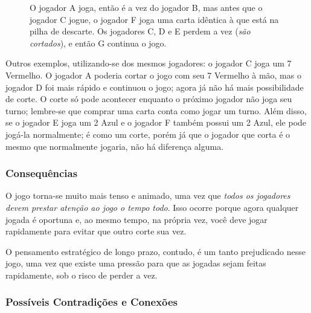 \begin{figure}[!h]
\centering
{}
\caption{O jogador A joga, então é a vez do jogador B, mas antes que o jogador C jogue, o jogador F joga uma carta idêntica à que está na pilha de descarte. Os jogadores C, D e E perdem a vez (\emph{são cortados}), e então G continua o jogo.}
\end{figure}

Outros exemplos, utilizando-se dos mesmos jogadores: o jogador C joga um 7 Vermelho. O jogador A poderia cortar o jogo com seu 7 Vermelho à mão, mas o jogador D foi mais rápido e continuou o jogo; agora já não há mais possibilidade de corte. O corte só pode acontecer enquanto o próximo jogador não joga seu turno; lembre-se que comprar uma carta conta como jogar um turno. Além disso, se o jogador E joga um 2 Azul e o jogador F também possui um 2 Azul, ele pode jogá-la normalmente; é como um corte, porém já que o jogador que corta é o mesmo que normalmente jogaria, não há diferença alguma.

\subsubsection{Consequências}

O jogo torna-se muito mais tenso e animado, uma vez que \emph{todos os jogadores devem prestar atenção ao jogo o tempo todo}. Isso ocorre porque agora qualquer jogada é oportuna e, ao mesmo tempo, na própria vez, você deve jogar rapidamente para evitar que outro corte sua vez.

O pensamento estratégico de longo prazo, contudo, é um tanto prejudicado nesse jogo, uma vez que existe uma pressão para que as jogadas sejam feitas rapidamente, sob o risco de perder a vez.

\subsubsection{Possíveis Contradições e Conexões}

